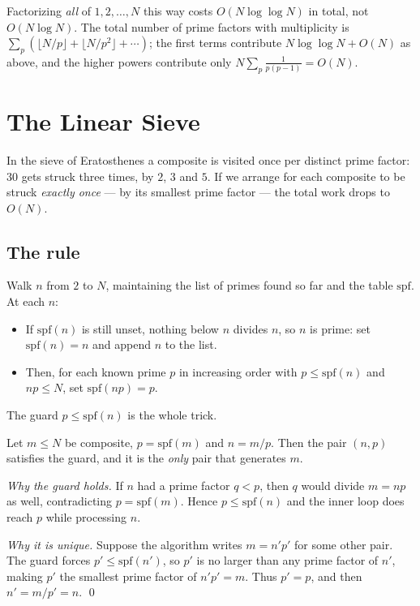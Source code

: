 \documentclass[11pt]{article}
\begin{document}
\begin{notebox}
Factorizing \emph{all} of $1, 2, \ldots, N$ this way costs
$O(N \log\log N)$ in total, not $O(N \log N)$. The total number of prime
factors with multiplicity is $\sum_p (\lfloor N/p \rfloor + \lfloor N/p^2
\rfloor + \cdots)$; the first terms contribute $N \log\log N + O(N)$ as above,
and the higher powers contribute only $N \sum_p \frac{1}{p(p-1)} = O(N)$.
\end{notebox}

\section{The Linear Sieve}

In the sieve of Eratosthenes a composite is visited once per distinct prime
factor: $30$ gets struck three times, by $2$, $3$ and $5$. If we arrange for
each composite to be struck \emph{exactly once} --- by its smallest prime
factor --- the total work drops to $O(N)$.

\subsection{The rule}
Walk $n$ from $2$ to $N$, maintaining the list of primes found so far and the
table $\mathrm{spf}$. At each $n$:
\begin{itemize}[leftmargin=1.5em]
  \item If $\mathrm{spf}(n)$ is still unset, nothing below $n$ divides $n$, so
        $n$ is prime: set $\mathrm{spf}(n) = n$ and append $n$ to the list.
  \item Then, for each known prime $p$ in increasing order with
        $p \le \mathrm{spf}(n)$ and $np \le N$, set $\mathrm{spf}(np) = p$.
\end{itemize}
The guard $p \le \mathrm{spf}(n)$ is the whole trick.

\begin{theorembox}
Let $m \le N$ be composite, $p = \mathrm{spf}(m)$ and $n = m/p$. Then the pair
$(n, p)$ satisfies the guard, and it is the \emph{only} pair that generates
$m$.

\emph{Why the guard holds.} If $n$ had a prime factor $q < p$, then $q$ would
divide $m = np$ as well, contradicting $p = \mathrm{spf}(m)$. Hence
$p \le \mathrm{spf}(n)$ and the inner loop does reach $p$ while processing $n$.

\emph{Why it is unique.} Suppose the algorithm writes $m = n'p'$ for some
other pair. The guard forces $p' \le \mathrm{spf}(n')$, so $p'$ is no larger
than any prime factor of $n'$, making $p'$ the smallest prime factor of
$n'p' = m$. Thus $p' = p$, and then $n' = m/p' = n$. \qed
\end{theorembox}
\end{document}
